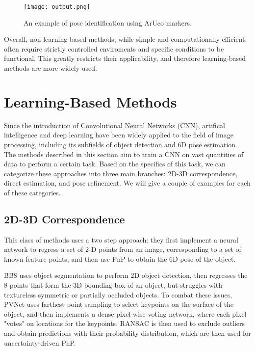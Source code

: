 \begin{figure}[ht]
    \centering
    \texttt{[image: output.png]}
    \caption{An example of pose identification using ArUco markers.}
    \label{fig:arucoExample}
\end{figure}

Overall, non-learning based methods, while simple and computationally efficient, often require strictly controlled enviroments and specific conditions to be functional. This greatly restricts their applicability, and therefore learning-based methods are more widely used.

\section{Learning-Based Methods}
\label{s:learningbasedmethods}

Since the introduction of Convolutional Neural Networks (CNN), artifical intelligence and deep learning have been widely applied to the field of image processing, including its subfields of object detection and 6D pose estimation. The methods described in this section aim to train a CNN on vast quantities of data to perform a certain task. Based on the specifics of this task, we can categorize these approaches into three main branches: 2D-3D correspondence, direct estimation, and pose refinement. We will give a couple of examples for each of these categories.

\subsection{2D-3D Correspondence}
\label{ss:2D3D}

This class of methods uses a two step approach: they first implement a neural network to regress a set of 2-D points from an image, corresponding to a set of known feature points, and then use PnP to obtain the 6D pose of the object.

BB8\cite{BB8} uses object segmentation to perform 2D object detection, then regresses the 8 points that form the 3D bounding box of an object, but struggles with textureless symmetric or partially occluded objects. To combat these issues, PVNet\cite{PVNet} uses farthest point sampling to select keypoints on the surface of the object, and then implements a dense pixel-wise voting network, where each pixel "votes" on locations for the keypoints. RANSAC\cite{RANSAC} is then used to exclude outliers and obtain predictions with their probability distribution, which are then used for uncertainty-driven PnP.

